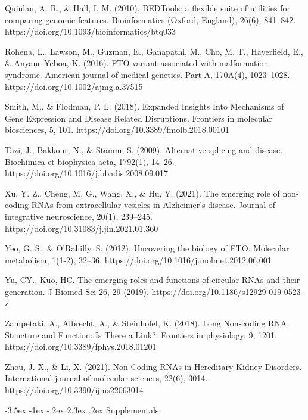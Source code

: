 \documentclass[11pt]{article}
\makeatletter
\renewcommand\section{\@startsection {section}{1}{\z@}%
                                       {-3.5ex \@plus -1ex \@minus -.2ex}%
                                       {2.3ex \@plus.2ex}%
                                       {\normalfont\fontfamily{phv}\fontsize{16}{19}\bfseries}}
\makeatother
\begin{document}
Quinlan, A. R., & Hall, I. M. (2010). BEDTools: a flexible suite of utilities for comparing genomic features. Bioinformatics (Oxford, England), 26(6), 841–842. https://doi.org/10.1093/bioinformatics/btq033 

Rohena, L., Lawson, M., Guzman, E., Ganapathi, M., Cho, M. T., Haverfield, E., & Anyane-Yeboa, K. (2016). FTO variant associated with malformation syndrome. American journal of medical genetics. Part A, 170A(4), 1023–1028. https://doi.org/10.1002/ajmg.a.37515 

Smith, M., & Flodman, P. L. (2018). Expanded Insights Into Mechanisms of Gene Expression and Disease Related Disruptions. Frontiers in molecular biosciences, 5, 101. https://doi.org/10.3389/fmolb.2018.00101 

Tazi, J., Bakkour, N., & Stamm, S. (2009). Alternative splicing and disease. Biochimica et biophysica acta, 1792(1), 14–26. https://doi.org/10.1016/j.bbadis.2008.09.017 

Xu, Y. Z., Cheng, M. G., Wang, X., & Hu, Y. (2021). The emerging role of non-coding RNAs from extracellular vesicles in Alzheimer's disease. Journal of integrative neuroscience, 20(1), 239–245. https://doi.org/10.31083/j.jin.2021.01.360 

Yeo, G. S., & O'Rahilly, S. (2012). Uncovering the biology of FTO. Molecular metabolism, 1(1-2), 32–36. https://doi.org/10.1016/j.molmet.2012.06.001 

Yu, CY., Kuo, HC. The emerging roles and functions of circular RNAs and their generation. J Biomed Sci 26, 29 (2019). https://doi.org/10.1186/s12929-019-0523-z 

Zampetaki, A., Albrecht, A., & Steinhofel, K. (2018). Long Non-coding RNA Structure and Function: Is There a Link?. Frontiers in physiology, 9, 1201. https://doi.org/10.3389/fphys.2018.01201 

Zhou, J. X., & Li, X. (2021). Non-Coding RNAs in Hereditary Kidney Disorders. International journal of molecular sciences, 22(6), 3014. https://doi.org/10.3390/ijms22063014 

 



\section{Supplementals} \label{s:supplementals}
\end{document}
